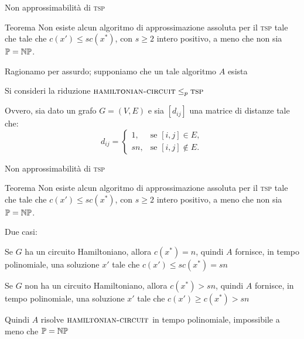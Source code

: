 \begin{frame}{Non approssimabilità di \textsc{tsp}}

\vspace{-9pt}
\begin{block}{Teorema}
Non esiste alcun algoritmo di approssimazione assoluta per il
\textsc{tsp} tale che 
 tale che $c(x') \le sc(x^*)$, con $s \geq 2$ intero positivo, a meno che non sia $\mathbb{P} = \mbox{$\mathbb{NP}$}$.
\end{block}

\medskip
{}
\BIL
\item Ragionamo per assurdo; supponiamo che un tale algoritmo $A$ esista
\item Si consideri la riduzione $\textsc{hamiltonian-circuit} \leq_p \textsc{tsp}$
\item Ovvero, sia dato un grafo $G=(V,E)$ e sia $[d_{ij}]$ una
matrice di distanze tale che:
\[
d_{ij} = \begin{cases}
1, &\textrm{se $[i, j] \in E$},\\
sn, &\textrm{se $[i, j] \notin E$}.
\end{cases}
\]
\EIL

\end{frame}

\begin{frame}{Non approssimabilità di \textsc{tsp}}

\vspace{-9pt}
\begin{block}{Teorema}
Non esiste alcun algoritmo di approssimazione assoluta per il
\textsc{tsp} tale che 
 tale che $c(x') \le sc(x^*)$, con $s \geq 2$ intero positivo, a meno che non sia $\mathbb{P} = \mbox{$\mathbb{NP}$}$.
\end{block}

\medskip
{}
\BIL
\item Due casi:
  \BI
  \item Se $G$ ha un circuito Hamiltoniano, allora $c(x^*) = n$, quindi $A$ fornisce, in tempo polinomiale, una soluzione $x'$ tale che $c(x') \le sc(x^*) = sn$
  \item Se $G$ non ha un circuito Hamiltoniano, allora $c(x^*) > sn$, quindi
  $A$ fornisce, in tempo polinomiale, una soluzione $x'$ tale che $c(x') \geq c(x^*) > sn$
  \EI
\item Quindi $A$ risolve $\textsc{hamiltonian-circuit}$ in tempo polinomiale,
impossibile a meno che $\mathbb{P} = \mbox{$\mathbb{NP}$}$
\EIL

\end{frame}


